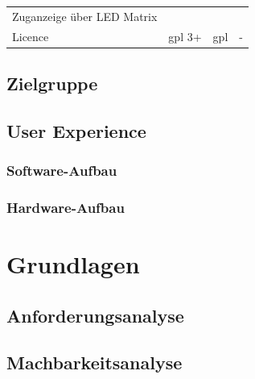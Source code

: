 \begin{longtable}[]{@{}llll@{}}
\begin{minipage}[t]{0.16\columnwidth}
Zuganzeige über LED Matrix\strut
\end{minipage}\tabularnewline
\begin{minipage}[t]{0.24\columnwidth}\raggedright
Licence\strut
\end{minipage} & \begin{minipage}[t]{0.24\columnwidth}\raggedright
\gls{gpl} 3+\strut
\end{minipage} & \begin{minipage}[t]{0.25\columnwidth}\raggedright
\gls{gpl}\strut
\end{minipage} & \begin{minipage}[t]{0.16\columnwidth}\raggedright
-\strut
\end{minipage}\tabularnewline
\bottomrule
\end{longtable}

\hypertarget{zielgruppe}{%
\subsection{Zielgruppe}\label{zielgruppe}}

\hypertarget{user-experience}{%
\subsection{User Experience}\label{user-experience}}

\hypertarget{software-aufbau}{%
\subsubsection{Software-Aufbau}\label{software-aufbau}}

\hypertarget{hardware-aufbau}{%
\subsubsection{Hardware-Aufbau}\label{hardware-aufbau}}

\hypertarget{grundlagen}{%
\section{Grundlagen}\label{grundlagen}}

\hypertarget{anforderungsanalyse}{%
\subsection{Anforderungsanalyse}\label{anforderungsanalyse}}

\hypertarget{machbarkeitsanalyse}{%
\subsection{Machbarkeitsanalyse}\label{machbarkeitsanalyse}}

